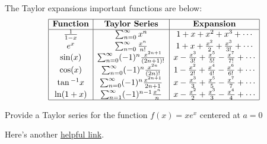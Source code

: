\begin{thm}
		The Taylor expansions important functions are below:
		\[
\begin{array}{|c|c|c|}
\hline
\textbf{Function} & \textbf{Taylor Series} & \textbf{Expansion} \\ \hline
\frac{1}{1-x} & \sum_{n=0}^{\infty} x^n & 1+x+x^2+x^3+\cdots \\

e^x & \sum_{n = 0}^\infty \frac{x^n}{n!} & 1 + x + \frac{x^2}{2} + \frac{x^3}{3!} + \cdots \\ 
\sin (x) & \sum_{n=0}^{\infty}(-1)^n \frac{x^{2 n+1}}{(2 n+1) !} & x-\frac{x^3}{3 !}+\frac{x^5}{5 !}-\frac{x^7}{7 !}+\cdots \\
\cos(x) & \sum_{n=0}^{\infty}(-1)^n \frac{x^{2 n}}{(2 n) !} & 1-\frac{x^2}{2 !}+\frac{x^4}{4 !}-\frac{x^6}{6 !}+\cdots \\ 
\tan { }^{-1} x & \sum_{n=0}^{\infty}(-1)^n \frac{x^{2 n+1}}{2 n+1} & x-\frac{x^3}{3}+\frac{x^5}{5}-\frac{x^7}{7}+\cdots \\
 \ln (1+x) & \sum_{n=1}^{\infty}(-1)^{n-1} \frac{x^n}{n} & x-\frac{x^2}{2}+\frac{x^3}{3}-\frac{x^4}{4}+\cdots \\
\hline
\end{array}
		\]
\end{thm}

\begin{exx}
	Provide a Taylor series for the function $f(x) = xe^x$ centered at $a = 0$
\end{exx}



\begin{aun}
	Here's another \href{https://math.libretexts.org/Courses/Monroe_Community_College/MTH_211_Calculus_II/Chapter_Ch10%3A_Power_Series/10.3%3A_Taylor_and_Maclaurin_Series/10.3E%3A_Exercises_for_Taylor_Polynomials_and_Taylor_Series}{helpful link}. 
\end{aun}



